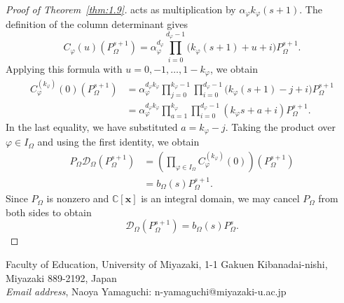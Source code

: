 \documentclass[12pt,a4paper]{article}
\theoremstyle{definition}
\numberwithin{definition}{section}
\begin{document}
\begin{proof}[Proof of Theorem~\ref{thm:1.9}]
acts as multiplication by $\alpha_\varphi k_\varphi(s+1)$.
The definition of the column determinant gives
\[
C_\varphi(u)(P_\Omega^{s+1})
=
\alpha_\varphi^{d_\varphi}
\prod_{i=0}^{d_\varphi-1}
\bigl(k_\varphi(s+1)+u+i\bigr)
P_\Omega^{s+1}.
\]
Applying this formula with $u=0,-1,\ldots,1-k_\varphi$, we obtain
\begin{align*}
C_\varphi^{(k_\varphi)}(0)(P_\Omega^{s+1})
&=
\alpha_\varphi^{d_\varphi k_\varphi}
\prod_{j=0}^{k_\varphi-1}
\prod_{i=0}^{d_\varphi-1}
\bigl(k_\varphi(s+1)-j+i\bigr)
P_\Omega^{s+1}\\
&=
\alpha_\varphi^{d_\varphi k_\varphi}
\prod_{a=1}^{k_\varphi}
\prod_{i=0}^{d_\varphi-1}
(k_\varphi s+a+i)
P_\Omega^{s+1}.
\end{align*}
In the last equality, we have substituted $a=k_\varphi-j$.
Taking the product over $\varphi\in I_\Omega$ and using the first identity,
we obtain
\[
\begin{aligned}
P_\Omega\mathcal D_\Omega(P_\Omega^{s+1})
&=
\left(
\prod_{\varphi\in I_\Omega}
C_\varphi^{(k_\varphi)}(0)
\right)
(P_\Omega^{s+1})\\
&=
b_\Omega(s)P_\Omega^{s+1}.
\end{aligned}
\]
Since $P_\Omega$ is nonzero and $\mathbb C[\bm x]$ is an integral domain,
we may cancel $P_\Omega$ from both sides to obtain
\[
\mathcal D_\Omega(P_\Omega^{s+1})
=
b_\Omega(s)P_\Omega^s.
\]
\end{proof}

\clearpage



\medskip
\begin{flushleft}
Faculty of Education,
University of Miyazaki,
1-1 Gakuen Kibanadai-nishi,
Miyazaki 889-2192,
Japan \\
{\it Email address}, Naoya Yamaguchi: n-yamaguchi@miyazaki-u.ac.jp \\
\end{flushleft}
\end{document}
